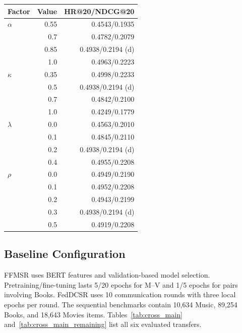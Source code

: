 \par\noindent\begin{minipage}{\columnwidth}\centering\footnotesize
{}\label{tab:sensitivity-values}
\setlength{\tabcolsep}{2.5pt}
\begin{tabular*}{\linewidth}{@{\extracolsep{\fill}}lrr@{}}
\toprule
Factor & Value & HR@20/NDCG@20 \\
\midrule
$\alpha$ & 0.55 & 0.4543/0.1935 \\
 & 0.7 & 0.4782/0.2079 \\
 & 0.85 & 0.4938/0.2194 (d) \\
 & 1.0 & 0.4963/0.2223 \\
$\kappa$ & 0.35 & 0.4998/0.2233 \\
 & 0.5 & 0.4938/0.2194 (d) \\
 & 0.7 & 0.4842/0.2100 \\
 & 1.0 & 0.4249/0.1779 \\
$\lambda$ & 0.0 & 0.4563/0.2010 \\
 & 0.1 & 0.4845/0.2110 \\
 & 0.2 & 0.4938/0.2194 (d) \\
 & 0.4 & 0.4955/0.2208 \\
$\rho$ & 0.0 & 0.4949/0.2190 \\
 & 0.1 & 0.4952/0.2208 \\
 & 0.2 & 0.4943/0.2199 \\
 & 0.3 & 0.4938/0.2194 (d) \\
 & 0.5 & 0.4919/0.2208 \\
\bottomrule
\end{tabular*}
\end{minipage}\par\addvspace{6pt}



\subsection{Baseline Configuration}\label{app:native}
FFMSR uses BERT features and validation-based model selection. Pretraining/fine-tuning lasts 5/20 epochs for M--V and 1/5 epochs for pairs involving Books. FedDCSR uses 10 communication rounds with three local epochs per round. The sequential benchmarks contain 10,634 Music, 89,254 Books, and 18,643 Movies items. Tables~\ref{tab:cross_main} and~\ref{tab:cross_main_remaining} list all six evaluated transfers.



